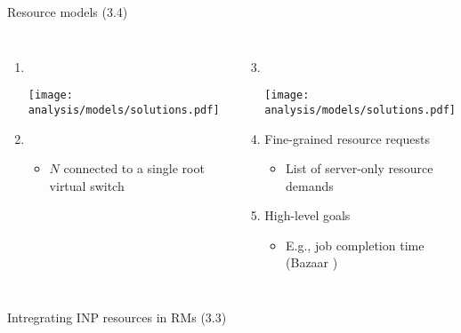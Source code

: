 \begin{frame}{Resource models (3.4)}
  \begin{columns}[T,onlytextwidth]
      \begin{enumerate}
        \item {}\\
        \begin{center}
          \texttt{[image: analysis/models/solutions.pdf]}
        \end{center}
        \item {}
        \begin{itemize}
          \item $N$  connected to a single root virtual switch
        \end{itemize}
      \end{enumerate}
      \begin{enumerate}
        \setcounter{enumi}{2}
        \item {}\\
        \begin{center}
          \texttt{[image: analysis/models/solutions.pdf]}
        \end{center}
        \item Fine-grained resource requests
        \begin{itemize}
          \item List of server-only resource demands
        \end{itemize}
        \item High-level goals
        \begin{itemize}
          \item E.g., job completion time (Bazaar \cite{bazaar})
        \end{itemize}
      \end{enumerate}
  \end{columns}
\end{frame}
\begin{frame}{Intregrating INP resources in RMs}
  (3.3)
\end{frame}
